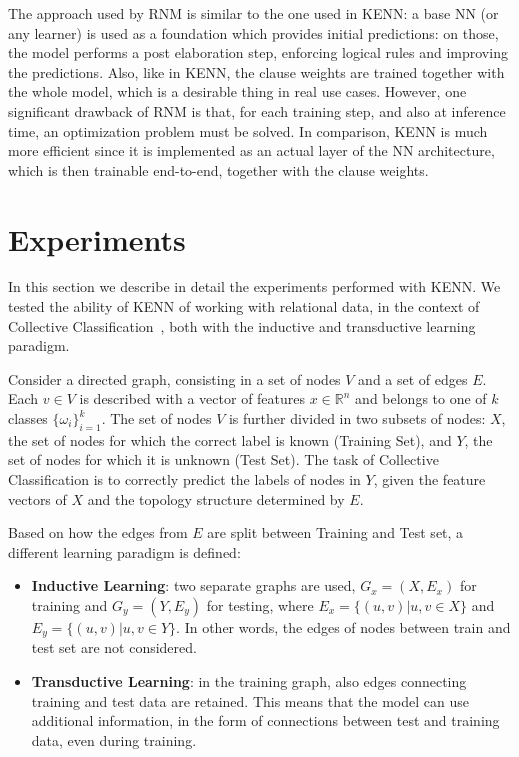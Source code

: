  The approach used by RNM is similar to the one used in KENN: a base NN (or any learner) is used as a foundation which provides initial predictions: on those, the model performs a post elaboration step, enforcing logical rules and improving the predictions. Also, like in KENN, the clause weights are trained together with the whole model, which is a desirable thing in real use cases. However, one significant drawback of RNM is that, for each training step, and also at inference time, an optimization problem must be solved. In comparison, KENN is much more efficient since it is implemented as an actual layer of the NN architecture, which is then trainable end-to-end, together with the clause weights.
 
 
 
 \section{Experiments}
 
In this section we describe in detail the experiments performed with KENN. We tested the ability of KENN of working with relational data, in the context of Collective Classification~\cite{sen2008collective}, both with the inductive and transductive learning paradigm. 

\begin{definition}
Consider a directed graph, consisting in a set of nodes $V$ and a set of edges $E$. Each $v \in V$ is described with a vector of features $x\in \mathbb{R}^n$ and belongs to one of $k$ classes $\{\omega_i\}_{i=1}^k$. The set of nodes $V$ is further divided in two subsets of nodes: $X$, the set of nodes for which the correct label is known (Training Set), and $Y$, the set of nodes for which it is unknown (Test Set). The task of Collective Classification is to correctly predict the labels of nodes in $Y$, given the feature vectors of $X$ and the topology structure determined by $E$. 
\end{definition}

Based on how the edges from $E$ are split between Training and Test set, a different learning paradigm is defined:

\begin{itemize}
	\item \textbf{Inductive Learning}: two separate graphs are used, $G_x = (X,E_x)$ for training and $G_y = (Y, E_y)$ for testing, where $E_x = \{(u,v) | u,v\in X\}$ and $E_y = \{(u,v) | u,v\in Y\}$. In other words, the edges of nodes between train and test set are not considered.
	\item \textbf{Transductive Learning}: in the training graph, also edges connecting training and test data are retained. This means that the model can use additional information, in the form of connections between test and training data, even during training.
\end{itemize}

